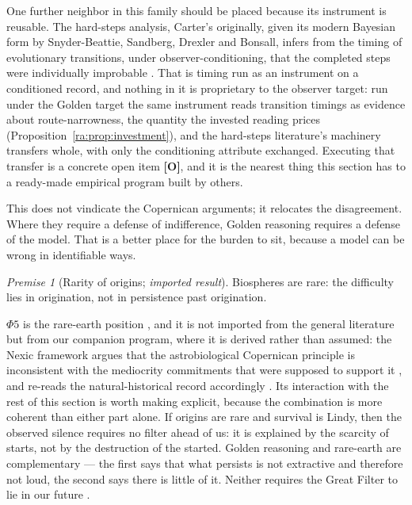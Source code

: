\documentclass[11pt]{article}
\numberwithin{equation}{section}
\theoremstyle{plain}
\theoremstyle{definition}
\theoremstyle{remark}
\newtheorem{premise}{Premise}
\begin{document}
One further neighbor in this family should be placed because its
instrument is reusable. The hard-steps analysis, Carter's
originally, given its modern Bayesian form by Snyder-Beattie,
Sandberg, Drexler and Bonsall, infers from the timing of
evolutionary transitions, under observer-conditioning, that the
completed steps were individually improbable \cite{Car83, SBSD21}.
That is timing run as an instrument on a conditioned record, and
nothing in it is proprietary to the observer target: run under the
Golden target the same instrument reads transition timings as
evidence about route-narrowness, the quantity the invested reading
prices (Proposition~\ref{ra:prop:investment}), and the hard-steps
literature's machinery transfers whole, with only the conditioning
attribute exchanged. Executing that transfer is a concrete open item
\textbf{[O]}, and it is the nearest thing this section has to a
ready-made empirical program built by others.

This does not vindicate the Copernican arguments; it relocates the
disagreement. Where they require a defense of indifference, Golden
reasoning requires a defense of the model. That is a better place for
the burden to sit, because a model can be wrong in identifiable ways.

\setcounter{premise}{4} %
\begin{premise}[Rarity of origins; \emph{imported result}]
\label{gr:phi5}
Biospheres are rare: the difficulty lies in origination, not in
persistence past origination.
\end{premise}

$\Phi5$ is the rare-earth position \cite{WB00}, and it is not imported
from the general literature but from our companion program,
where it is derived rather than assumed: the Nexic framework
\cite{Nexus} argues that the astrobiological Copernican principle
is inconsistent with the mediocrity commitments that were supposed to
support it \cite{Ben26Found}, and re-reads the natural-historical record
accordingly \cite{Ben26Optimal}. Its interaction with the rest of this
section is worth making explicit, because the combination is more
coherent than either part alone. If origins are rare and survival is
Lindy, then the observed silence requires no filter ahead of us: it is
explained by the scarcity of starts, not by the destruction of the
started. Golden reasoning and rare-earth are complementary --- the first
says that what persists is not extractive and therefore not loud, the
second says there is little of it. Neither requires the Great Filter to
lie in our future \cite{Han98,SDO18}.
\end{document}
